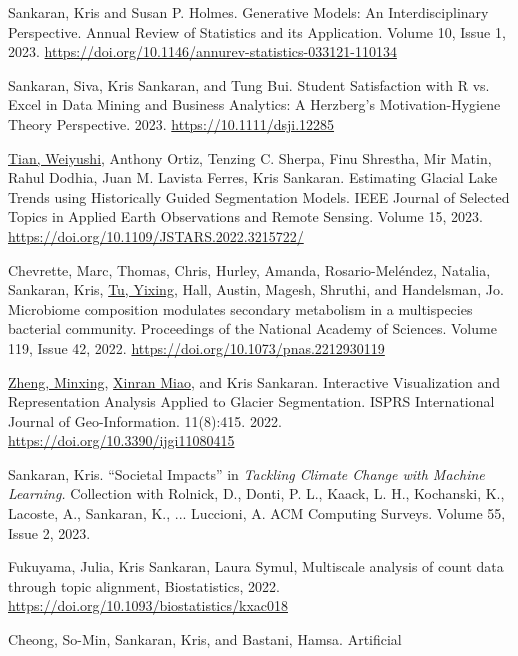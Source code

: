 \documentclass[letterpaper]{article}
\renewenvironment{itemize}{
  \begin{list}{}{
    \setlength{\leftmargin}{1.5em}
  }
}{
  \end{list}
}
\begin{document}
\begin{itemize}
\item Sankaran, Kris and Susan P. Holmes. Generative Models: An
Interdisciplinary Perspective. Annual Review of Statistics and its
Application. Volume 10, Issue 1, 2023. \href{https://doi.org/10.1146/annurev-statistics-033121-110134}{https://doi.org/10.1146/annurev-statistics-033121-110134}
\item Sankaran, Siva, Kris Sankaran, and Tung Bui. Student Satisfaction with R
vs. Excel in Data Mining and Business Analytics: A Herzberg's Motivation-Hygiene
Theory Perspective. 2023. \href{https://doi.org/10.1111/dsji.12285}{https://10.1111/dsji.12285}
\item \underline{Tian, Weiyushi}, Anthony Ortiz, Tenzing C. Sherpa, Finu Shrestha, Mir
Matin, Rahul Dodhia, Juan M. Lavista Ferres, Kris Sankaran. Estimating
Glacial Lake Trends using Historically Guided Segmentation Models. IEEE Journal
of Selected Topics in Applied Earth Observations and Remote Sensing. Volume 15,
2023. \href{https://doi.org/10.1109/JSTARS.2022.3215722/}{https://doi.org/10.1109/JSTARS.2022.3215722/}
\item Chevrette, Marc, Thomas, Chris, Hurley, Amanda, Rosario-Mel{\'e}ndez,
Natalia, Sankaran, Kris, \underline{Tu, Yixing}, Hall, Austin, Magesh, Shruthi,
and Handelsman, Jo. Microbiome composition modulates secondary metabolism in a
multispecies bacterial community. Proceedings of the National Academy of
Sciences. Volume 119, Issue 42, 2022. \href{https://doi.org/10.1073/pnas.2212930119}{https://doi.org/10.1073/pnas.2212930119}
\item \underline{Zheng, Minxing}, \underline{Xinran Miao}, and Kris Sankaran.
Interactive Visualization and Representation Analysis Applied to Glacier
Segmentation. ISPRS International Journal of Geo-Information. 11(8):415. 2022.
\href{https://doi.org/10.3390/ijgi11080415}{https://doi.org/10.3390/ijgi11080415}
\item Sankaran, Kris. ``Societal Impacts'' in \textit{Tackling Climate Change
with Machine Learning.} Collection with Rolnick, D., Donti, P. L., Kaack, L.
H., Kochanski, K., Lacoste, A., Sankaran, K., ... Luccioni, A. ACM Computing
Surveys. Volume 55, Issue 2, 2023.
\item Fukuyama, Julia, Kris Sankaran, Laura Symul, Multiscale analysis of count
data through topic alignment, Biostatistics, 2022.
\href{https://doi.org/10.1093/biostatistics/kxac018}{https://doi.org/10.1093/biostatistics/kxac018}
\item Cheong, So-Min, Sankaran, Kris, and Bastani, Hamsa. Artificial

\end{itemize}
\end{document}
